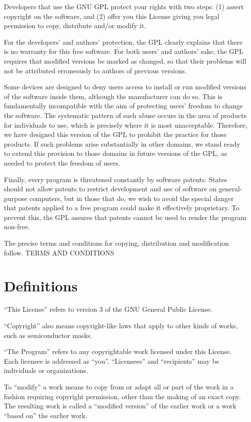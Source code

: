 Developers that use the GNU GPL protect your rights with two steps: (1) assert copyright on the software, and (2) offer you this License giving you legal permission to copy, distribute and/or modify it.

For the developers' and authors' protection, the GPL clearly explains that there is no warranty for this free software. For both users' and authors' sake, the GPL requires that modified versions be marked as changed, so that their problems will not be attributed erroneously to authors of previous versions.

Some devices are designed to deny users access to install or run modified versions of the software inside them, although the manufacturer can do so. This is fundamentally incompatible with the aim of protecting users' freedom to change the software. The systematic pattern of such abuse occurs in the area of products for individuals to use, which is precisely where it is most unacceptable. Therefore, we have designed this version of the GPL to prohibit the practice for those products. If such problems arise substantially in other domains, we stand ready to extend this provision to those domains in future versions of the GPL, as needed to protect the freedom of users.

Finally, every program is threatened constantly by software patents. States should not allow patents to restrict development and use of software on general-purpose computers, but in those that do, we wish to avoid the special danger that patents applied to a free program could make it effectively proprietary. To prevent this, the GPL assures that patents cannot be used to render the program non-free.

The precise terms and conditions for copying, distribution and modification follow.
TERMS AND CONDITIONS
\section{Definitions}

“This License” refers to version 3 of the GNU General Public License.

“Copyright” also means copyright-like laws that apply to other kinds of works, such as semiconductor masks.

“The Program” refers to any copyrightable work licensed under this License. Each licensee is addressed as “you”. “Licensees” and “recipients” may be individuals or organizations.

To “modify” a work means to copy from or adapt all or part of the work in a fashion requiring copyright permission, other than the making of an exact copy. The resulting work is called a “modified version” of the earlier work or a work “based on” the earlier work.

